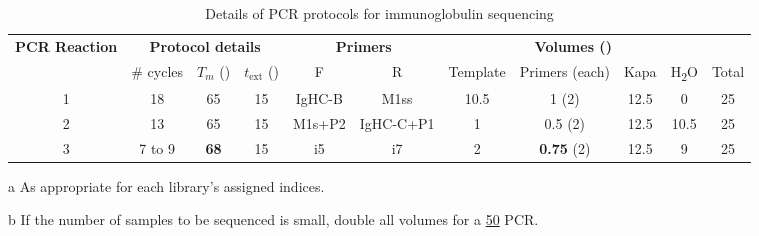 \begin{table}[h]
\def\arraystretch{1.5}
\centering\small
\begin{threeparttable}
\caption{Details of PCR protocols for \Nfu immunoglobulin sequencing}
\begin{tabular}{c|ccc|cc|ccccc}\toprule
\multirow{2}{*}{\textbf{PCR Reaction}} & \multicolumn{3}{c|}{\textbf{Protocol details}} & \multicolumn{2}{c|}{\textbf{Primers}} & \multicolumn{4}{c}{\textbf{Volumes (\ul{})}}\\
 & \# cycles & $T_m$ (\degC{}) & $t_\mathrm{ext}$ (\secs{}) & F & R & Template & Primers (each) & Kapa & H\textsubscript{2}O & Total \\\midrule
1 & 18 & 65 & 15 & IgHC-B & M1ss & 10.5 & 1 (\x{}2) & 12.5 & 0 & 25 \\\midrule
2 & 13 & 65 & 15 & M1s+P2 & IgHC-C+P1 & 1 & 0.5 (\x{}2) & 12.5 & 10.5 & 25 \\\midrule
3 & 7 to 9 & \textbf{68} & 15 & i5\tnote{a} & i7\tnote{a} & 2 & \textbf{0.75} (\x{}2) & 12.5 & 9 & 25\tnote{b} \\
\bottomrule
\end{tabular}
\begin{tablenotes}
\item[a] As appropriate for each library's assigned indices.
\item[b] If the number of samples to be sequenced is small, double all volumes for a \ul{50} PCR.
\end{tablenotes}
\label{tab:pcr}
\end{threeparttable}
\end{table}



